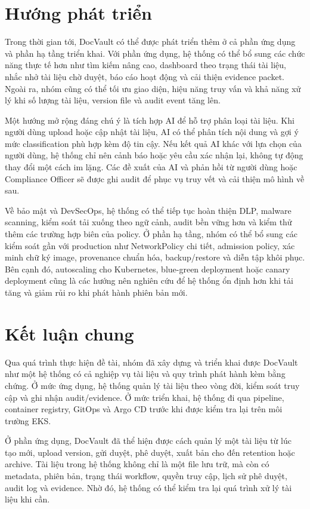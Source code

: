 \section{Hướng phát triển}

Trong thời gian tới, DocVault có thể được phát triển thêm ở cả phần ứng dụng và phần hạ tầng triển khai. Với phần ứng dụng, hệ thống có thể bổ sung các chức năng thực tế hơn như tìm kiếm nâng cao, dashboard theo trạng thái tài liệu, nhắc nhở tài liệu chờ duyệt, báo cáo hoạt động và cải thiện evidence packet. Ngoài ra, nhóm cũng có thể tối ưu giao diện, hiệu năng truy vấn và khả năng xử lý khi số lượng tài liệu, version file và audit event tăng lên.

Một hướng mở rộng đáng chú ý là tích hợp AI để hỗ trợ phân loại tài liệu. Khi người dùng upload hoặc cập nhật tài liệu, AI có thể phân tích nội dung và gợi ý mức classification phù hợp kèm độ tin cậy. Nếu kết quả AI khác với lựa chọn của người dùng, hệ thống chỉ nên cảnh báo hoặc yêu cầu xác nhận lại, không tự động thay đổi một cách im lặng. Các đề xuất của AI và phản hồi từ người dùng hoặc Compliance Officer sẽ được ghi audit để phục vụ truy vết và cải thiện mô hình về sau.

Về bảo mật và DevSecOps, hệ thống có thể tiếp tục hoàn thiện DLP, malware scanning, kiểm soát tải xuống theo ngữ cảnh, audit bền vững hơn và kiểm thử thêm các trường hợp biên của policy. Ở phần hạ tầng, nhóm có thể bổ sung các kiểm soát gần với production như NetworkPolicy chi tiết, admission policy, xác minh chữ ký image, provenance chuẩn hóa, backup/restore và diễn tập khôi phục. Bên cạnh đó, autoscaling cho Kubernetes, blue-green deployment hoặc canary deployment cũng là các hướng nên nghiên cứu để hệ thống ổn định hơn khi tải tăng và giảm rủi ro khi phát hành phiên bản mới.

\section{Kết luận chung}

Qua quá trình thực hiện đề tài, nhóm đã xây dựng và triển khai được DocVault như một hệ thống có cả nghiệp vụ tài liệu và quy trình phát hành kèm bằng chứng. Ở mức ứng dụng, hệ thống quản lý tài liệu theo vòng đời, kiểm soát truy cập và ghi nhận audit/evidence. Ở mức triển khai, hệ thống đi qua pipeline, container registry, GitOps và Argo CD trước khi được kiểm tra lại trên môi trường EKS.

Ở phần ứng dụng, DocVault đã thể hiện được cách quản lý một tài liệu từ lúc tạo mới, upload version, gửi duyệt, phê duyệt, xuất bản cho đến retention hoặc archive. Tài liệu trong hệ thống không chỉ là một file lưu trữ, mà còn có metadata, phiên bản, trạng thái workflow, quyền truy cập, lịch sử phê duyệt, audit log và evidence. Nhờ đó, hệ thống có thể kiểm tra lại quá trình xử lý tài liệu khi cần.

